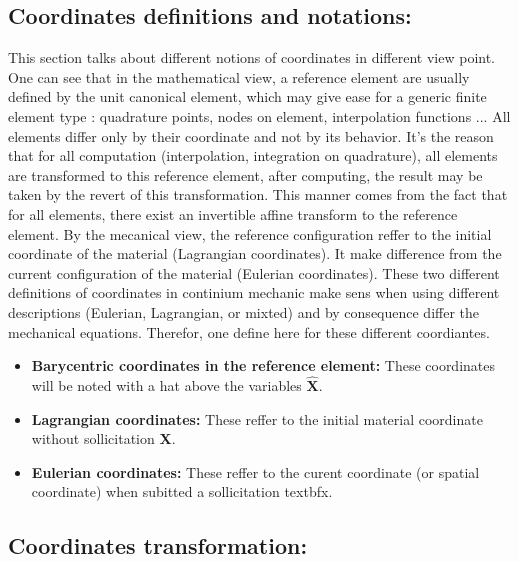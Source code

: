 \documentclass[a4paper,10pt]{article}
\begin{document}
\subsection{Coordinates definitions and notations: }
This section talks about different notions of coordinates in different view point. One can see that in the mathematical view, a reference element are usually defined by the unit canonical element, which may give ease for a generic finite element type : quadrature points, nodes on element, interpolation functions ... All elements differ only by their coordinate and not by its behavior. It's the reason that for all computation (interpolation, integration on quadrature), all elements are transformed to this reference element, after computing, the result may be taken by the revert of this transformation. This manner comes from the fact that for all elements, there exist an invertible affine transform to the reference element. By the mecanical view, the reference configuration reffer to the initial coordinate of the material (Lagrangian coordinates). It make difference from the current configuration of the material (Eulerian coordinates). These two different definitions of coordinates in continium mechanic make sens when using different descriptions (Eulerian, Lagrangian, or mixted) and by consequence differ the mechanical equations. Therefor, one define here for these different coordiantes. 
\begin{itemize}
 \item \textbf{Barycentric coordinates in the reference element: }These coordinates will be noted with a hat above the variables $\hat{\textbf{X}}$.
 \item \textbf{Lagrangian coordinates: }These reffer to the initial material coordinate without sollicitation \textbf{X}.
 \item \textbf{Eulerian coordinates: }These reffer to the curent coordinate (or spatial coordinate) when subitted a sollicitation textbf{x}.
\end{itemize}
\subsection{Coordinates transformation: }
\end{document}
